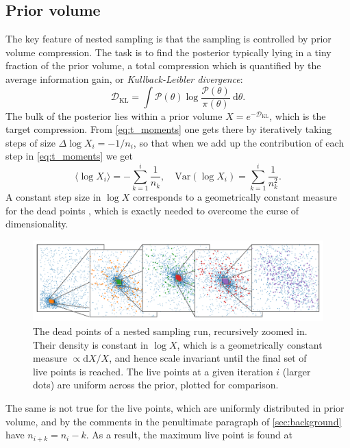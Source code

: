 \documentclass[usenatbib]{mnras}
\newcommand{\DKL}{\mathcal{D}_\mathrm{KL}}
\begin{document}
\subsection{Prior volume}\label{sec:prior_volume}
The key feature of nested sampling is that the sampling is controlled by prior volume compression. The task is to find the posterior typically lying in a tiny fraction of the prior volume, a total compression which is quantified by the average information gain, or \textit{Kullback-Leibler divergence}:
\begin{equation}\label{eq:DKL}
   \DKL = \int \mathcal{P}(\theta) \log \frac{\mathcal{P}(\theta)}{\pi(\theta)}\ \mathrm{d}\theta. 
\end{equation}
The bulk of the posterior lies within a prior volume ${X = e^{-\DKL}}$, which is the target compression. From \cref{eq:t_moments} one gets there by iteratively taking steps of size ${\Delta \log X_i = -1/n_i}$, so that when we add up the contribution of each step in \eqref{eq:t_moments} we get
\begin{equation}
    \langle\log X_i\rangle = -\sum_{k=1}^i \frac{1}{n_k}, \quad \mathrm{Var}(\log X_i) = \sum_{k=1}^i \frac{1}{n_k^2}.
\end{equation}
A constant step size in $\log X$ corresponds to a geometrically constant measure for the dead points , which is exactly needed to overcome the curse of dimensionality.
\begin{figure}
\begin{center}
    \includegraphics{figures/dead_measure_live.pdf}
\end{center}
\caption{The dead points of a nested sampling run, recursively zoomed in. Their density is constant in $\log X$, which is a geometrically constant measure $\propto \mathrm{d} X/X$, and hence scale invariant until the final set of live points is reached. The live points at a given iteration $i$ (larger dots) are uniform across the prior, plotted for comparison.}
\label{fig:dead_measure}
\end{figure}
\par
The same is not true for the live points, which are uniformly distributed in prior volume, and by the comments in the penultimate paragraph of \cref{sec:background} have ${n_{i+k} = n_i-k}$. As a result, the maximum live point is found at 
\end{document}
